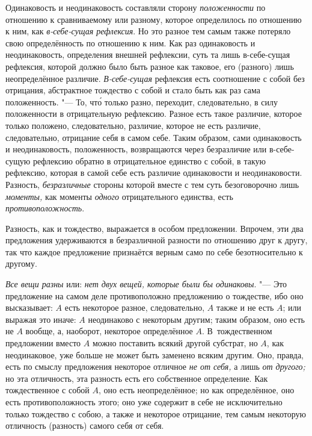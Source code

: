 Одинаковость и неодинаковость составляли сторону
{\em положенности} по отношению к сравниваемому или
разному, которое определилось по отношению к ним, как
{\em в-себе-сущая рефлексия}. Но это разное тем самым
также потеряло свою определённость по отношению к ним. Как раз одинаковость
и неодинаковость, определения внешней рефлексии, суть та лишь в-себе-сущая
рефлексия, которой должно было быть разное как таковое, его (разного) лишь
неопределённое различие. {\em В-себе-сущая} рефлексия
есть соотношение с собой без отрицания, абстрактное тождество с собой и
стало быть как раз сама положенность. "--- То, чт\'{о} только разно, переходит,
следовательно, в силу положенности в отрицательную рефлексию. Разное есть
такое различие, которое только положено, следовательно, различие, которое
не есть различие, следовательно, отрицание себя в самом себе. Таким
образом, сами одинаковость и неодинаковость, положенность, возвращаются
через безразличие или в-себе-сущую рефлексию обратно в отрицательное
единство с собой, в такую рефлексию, которая в самой себе есть различие
одинаковости и неодинаковости. Разность,
{\em безразличные} стороны которой вместе с тем суть
безоговорочно лишь {\em моменты,} как моменты
{\em одного} отрицательного единства, есть {\em противоположность}.


Разность, как и тождество, выражается в особом предложении. Впрочем, эти два
предложения удерживаются в безразличной разности по отношению друг к другу,
так что каждое предложение признаётся верным само по себе безотносительно к
другому.

{\em Все вещи разны} или: {\em нет
двух вещей, которые были бы одинаковы}. "--- Это предложение на самом деле
противоположно предложению о тождестве, ибо оно высказывает: $A$
есть некоторое разное, следовательно, $A$ также и не есть
$A$; или выражая это иначе: $A$ неодинаково с некоторым
другим; таким образом, оно есть не $A$ вообще, а, наоборот,
некоторое определённое $A$. В~тождественном предложении вместо
$A$ можно поставить всякий другой субстрат, но $A$, как
неодинаковое, уже больше не может быть заменено всяким другим. Оно, правда,
есть по смыслу предложения некоторое отличное {\em не от себя,}
а лишь {\em от другого;} но эта отличность,
эта разность есть его собственное определение. Как тождественное с собой
$A$, оно есть неопределённое; но как определённое, оно есть
противоположность этого; оно уже содержит в себе не исключительно только
тождество с собою, а также и некоторое отрицание, тем самым некоторую
отличность (разность) самого себя от себя.

